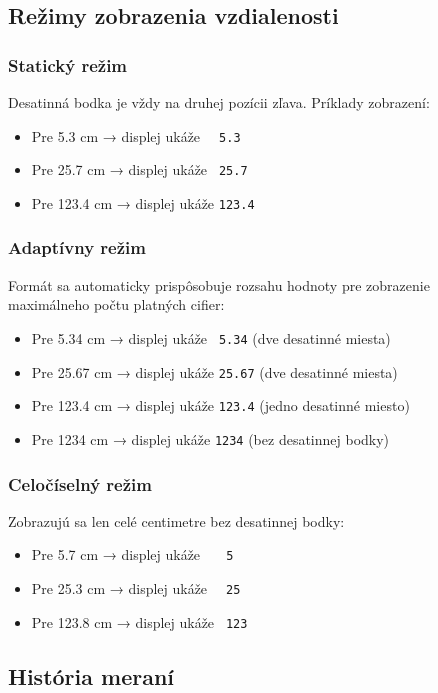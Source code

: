 \documentclass[a4paper, 11pt]{article}
\begin{document}
\subsection{Režimy zobrazenia vzdialenosti}

\subsubsection{Statický režim}
Desatinná bodka je vždy na druhej pozícii zľava. Príklady zobrazení:
\begin{itemize}
    \item Pre 5.3 cm → displej ukáže \texttt{~~5.3}
    \item Pre 25.7 cm → displej ukáže \texttt{~25.7}
    \item Pre 123.4 cm → displej ukáže \texttt{123.4}
\end{itemize}

\subsubsection{Adaptívny režim}
Formát sa automaticky prispôsobuje rozsahu hodnoty pre zobrazenie maximálneho počtu platných cifier:
\begin{itemize}
    \item Pre 5.34 cm → displej ukáže \texttt{~5.34} (dve desatinné miesta)
    \item Pre 25.67 cm → displej ukáže \texttt{25.67} (dve desatinné miesta)
    \item Pre 123.4 cm → displej ukáže \texttt{123.4} (jedno desatinné miesto)
    \item Pre 1234 cm → displej ukáže \texttt{1234} (bez desatinnej bodky)
\end{itemize}

\subsubsection{Celočíselný režim}
Zobrazujú sa len celé centimetre bez desatinnej bodky:
\begin{itemize}
    \item Pre 5.7 cm → displej ukáže \texttt{~~~5}
    \item Pre 25.3 cm → displej ukáže \texttt{~~25}
    \item Pre 123.8 cm → displej ukáže \texttt{~123}
\end{itemize}

\subsection{História meraní}
\end{document}
